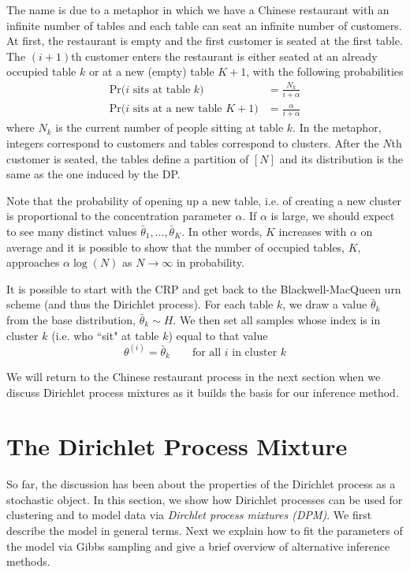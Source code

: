 \documentclass[final,3p,times,twocolumn]{elsarticle}
\begin{document}
The name is due to a metaphor in which we have a Chinese restaurant with an infinite number of tables and each table can seat an infinite number of customers.
At first, the restaurant is empty and the first customer is seated at the first table. 
The $(i+1)$th customer enters the restaurant is either seated at an already occupied table $k$ or at a new (empty) table $K+1$, with the following probabilities
\begin{equation*}
\begin{split}
\mbox{Pr($i$ sits at table $k$)} &= \frac{N_k}{i+\alpha}\\
\mbox{Pr($i$ sits at a new table $K+1$)} &= \frac{\alpha}{i+\alpha}
\end{split}
\end{equation*}
where $N_k$ is the current number of people sitting at table $k$.
In the metaphor, integers correspond to customers and tables correspond to clusters. 
After the $N$th customer is seated, the tables define a partition of $[N]$ and its distribution is the same as the one induced by the DP.

Note that the probability of opening up a new table, i.e. of creating a new cluster is proportional to the concentration parameter $\alpha$.
If $\alpha$ is large, we should expect to see many distinct values $\bar \theta_1,\dots,\bar \theta_K$.
In other words, $K$ increases with $\alpha$ on average and it is possible to show that the number of occupied tables, $K$, approaches $\alpha \log(N)$ as $N \rightarrow \infty$ in probability.

It is possible to start with the CRP and get back to the Blackwell-MacQueen urn scheme (and thus the Dirichlet process). 
For each table $k$, we draw a value $\bar \theta_k$ from the base distribution, $\bar \theta_k \sim H$.
We then set all samples whose index is in cluster $k$ (i.e. who ``sit" at table $k$) equal to that value
\begin{equation*}
\theta^{(i)} = \bar \theta_k \qquad\mbox{for all $i$ in cluster $k$}
\end{equation*}

We will return to the Chinese restaurant process in the next section when we discuss Dirichlet process mixtures as it builds the basis for our inference method.

\section{The Dirichlet Process Mixture}
\label{sect:DPM}
So far, the discussion has been about the properties of the Dirichlet process as a stochastic object.
In this section, we show how Dirichlet processes can be used for clustering and to model data via \emph{Dirchlet process mixtures (DPM)}.
We first describe the model in general terms.
Next we explain how to fit the parameters of the model via Gibbs sampling and give a brief overview of alternative inference methods.
\end{document}
